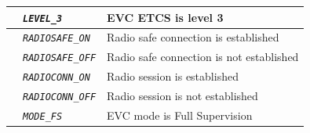 \documentclass{template/openetcs}
\begin{document}
\begin{itemize}
\begin{longtable}{|l|l|l|}
			\hline

			&	\begin{minipage}[t]{0.40\linewidth} \emph{\texttt{LEVEL\_3}} \end{minipage}
			&	\begin{minipage}[t]{0.38\linewidth} EVC ETCS is level 3 \end{minipage} \\ 

			\hline

			&	\begin{minipage}[t]{0.40\linewidth} \emph{\texttt{RADIOSAFE\_ON}} \end{minipage}
			&	\begin{minipage}[t]{0.38\linewidth} Radio safe connection is established \end{minipage} \\ 

			\hline

			&	\begin{minipage}[t]{0.40\linewidth} \emph{\texttt{RADIOSAFE\_OFF}} \end{minipage}
			&	\begin{minipage}[t]{0.38\linewidth} Radio safe connection is not established \end{minipage} \\ 

			\hline

			&	\begin{minipage}[t]{0.40\linewidth} \emph{\texttt{RADIOCONN\_ON}} \end{minipage}
			&	\begin{minipage}[t]{0.38\linewidth} Radio session is established \end{minipage} \\ 

			\hline

			&	\begin{minipage}[t]{0.40\linewidth} \emph{\texttt{RADIOCONN\_OFF}} \end{minipage}
			&	\begin{minipage}[t]{0.38\linewidth} Radio session is not established \end{minipage} \\ 

			\hline

			&	\begin{minipage}[t]{0.40\linewidth} \emph{\texttt{MODE\_FS}} \end{minipage}
			&	\begin{minipage}[t]{0.38\linewidth} EVC mode is Full Supervision \end{minipage} \\ 


\end{longtable}
\end{itemize}
\end{document}
